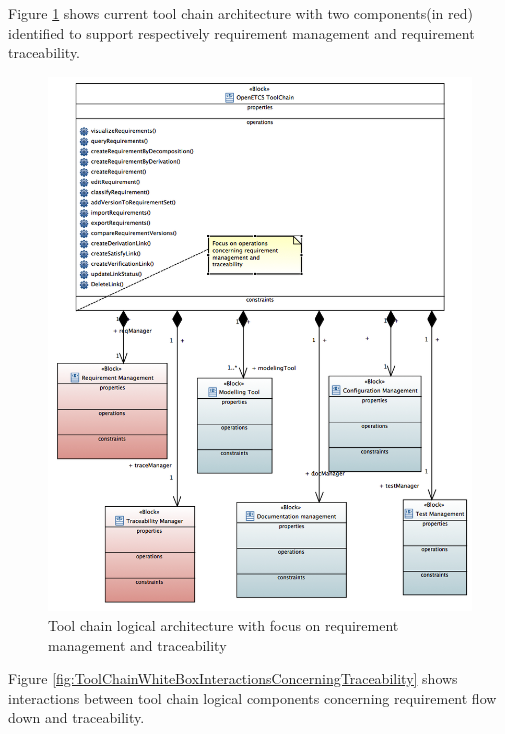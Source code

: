 \documentclass[11pt]{template/openetcs_report}
\begin{document}
Figure \ref{fig:ToolChainLogicalArchitecture} shows current tool chain architecture with two components(in red) identified to support respectively requirement management and requirement traceability.

\begin{figure}[htb]
\centering
\includegraphics[width=.9\linewidth]{images/ToolChainLogicalArchitecture.png}
\caption{\label{fig:ToolChainLogicalArchitecture}Tool chain logical architecture with focus on requirement management and traceability}
\end{figure}

Figure \ref{fig:ToolChainWhiteBoxInteractionsConcerningTraceability} shows interactions between tool chain logical components concerning requirement flow down and traceability.
\end{document}
